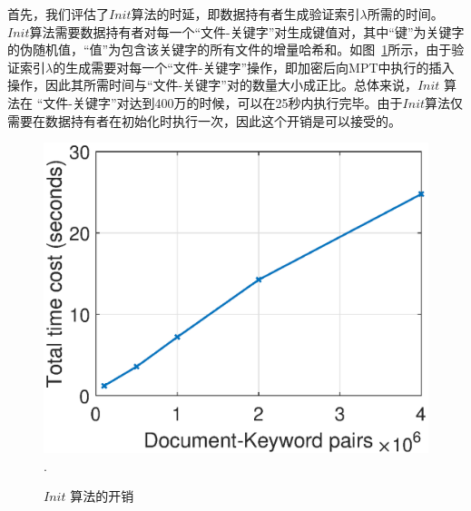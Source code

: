 首先，我们评估了$Init$算法的时延，即数据持有者生成验证索引$\lambda$所需的时间。$Init$算法需要数据持有者对每一个“文件-关键字”对生成键值对，其中“键”为关键字的伪随机值，“值”为包含该关键字的所有文件的增量哈希和。如图~\ref{fig:init}所示，由于验证索引$\lambda$的生成需要对每一个“文件-关键字”操作，即加密后向MPT中执行的插入操作，因此其所需时间与“文件-关键字”对的数量大小成正比。总体来说，$Init$ 算法在 “文件-关键字”对达到400万的时候，可以在25秒内执行完毕。由于$Init$算法仅需要在数据持有者在初始化时执行一次，因此这个开销是可以接受的。
\begin{figure}[h]
\centering
\includegraphics[width=3.5 in]{expr/initialization}
\DeclareGraphicsExtensions.
\caption{$Init$ 算法的开销}
\label{fig:init}
\end{figure}

